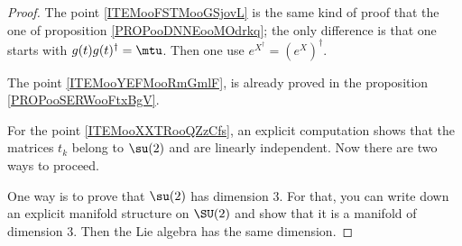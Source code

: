 \begin{proof}
    The point \ref{ITEMooFSTMooGSjovL} is the same kind of proof that the one of proposition \ref{PROPooDNNEooMOdrkq}; the only difference is that one starts with \( g(t)g(t)^{\dag}=\mtu\). Then one use \(  e^{X^{\dag}}=( e^{X})^{\dag}\).

    The point \ref{ITEMooYEFMooRmGmlF}, is already proved in the proposition \ref{PROPooSERWooFtxBgV}.

    For the point \ref{ITEMooXXTRooQZzCfs}, an explicit computation shows that the matrices \( t_k\) belong to \( \su(2)\) and are linearly independent. Now there are two ways to proceed.
    
    One way is to prove that \( \su(2)\) has dimension \( 3\). For that, you can write down an explicit manifold structure on \( \SU(2)\) and show that it is a manifold of dimension \( 3\). Then the Lie algebra has the same dimension.


\end{proof}
